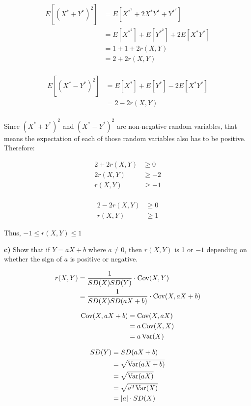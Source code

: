 \documentclass[11pt]{article}
\begin{document}
\begin{align*}
	E[(X^{*}+Y^{*})^{2}] &= E[X^{*^{2}} +2X^{*}Y^{*} + Y^{*^{2}} ]  \\
	&= E[X^{*^{2}}] + E[Y^{*^{2}}] + 2E[X^{*}Y^{*}] \\
	&= 1 + 1 + 2r(X,Y)  \\
	&= 2+2r(X,Y) \\
\end{align*}


\begin{align*}
	E[(X^{*} - Y^{*})^{2}] &= E[X^{*}] + E[Y^{*}] - 2E[X^{*}Y^{*}] \\
	&= 2 - 2r(X,Y) \\
\end{align*}

Since $(X^* + Y^*)^2$ and $(X^* - Y^*)^2$
are non-negative random variables, that means the expectation of each of those random variables also has to be positive. Therefore: 

\begin{align*}
	2+2r(X,Y) &\ge 0\\
	2r(X,Y) &\ge -2\\
	r(X,Y) &\ge -1\\
\end{align*}

\begin{align*}
	2-2r(X,Y) &\ge 0\\
	r(X,Y) &\ge 1
\end{align*}

Thus, $-1 \le r(X, Y) \le 1$


\textbf{c)} Show that if \(Y = aX+b\) where \(a \ne 0\), then
\(r(X, Y)\) is 1 or \(-1\) depending on whether the sign of \(a\) is
positive or negative.


\begin{align*}
	r(X,Y) &= \frac{1}{SD(X)SD(Y)} \cdot \operatorname{Cov}(X,Y) \\
	&= \frac{1}{SD(X)SD(aX+b)} \cdot \operatorname{Cov}(X, aX+b) \\
\end{align*}

\begin{align*}
	\operatorname{Cov}(X, aX+b) &= \operatorname{Cov}(X, aX) \\
	&= a\operatorname{Cov}(X, X) \\
	&= a\operatorname{Var}(X) \\
\end{align*}

\begin{align*}
	SD(Y) &= SD(aX+b) \\
	      &= \sqrt{\operatorname{Var}(aX+b)} \\
	      &= \sqrt{\operatorname{Var}(aX)}\\
	      &= \sqrt{a^{2}\operatorname{Var}(X)} \\
	      &= |a|\cdot SD(X) \\
\end{align*}
\end{document}
